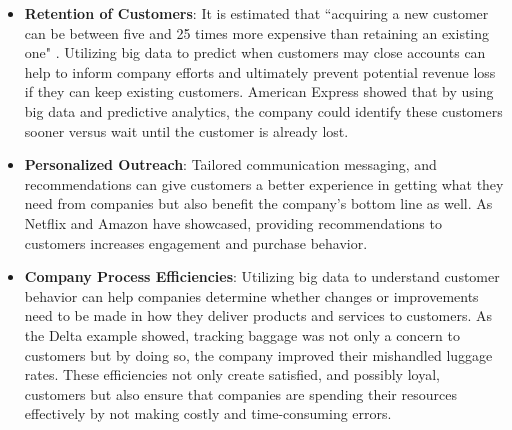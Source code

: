 \documentclass[sigconf]{acmart}
\begin{document}
\begin{itemize}
 \item \textbf{Retention of Customers}: It is estimated that ``acquiring a new customer can be between five and 25 times more expensive than retaining an existing one" \cite{Gallo2014}. Utilizing big data to predict when customers may close accounts can help to inform company efforts and ultimately prevent potential revenue loss if they can keep existing customers. American Express showed that by using big data and predictive analytics, the company could identify these customers sooner versus wait until the customer is already lost. 
 \item \textbf{Personalized Outreach}: Tailored communication messaging, and recommendations can give customers a better experience in getting what they need from companies but also benefit the company's bottom line as well. As Netflix and Amazon have showcased, providing recommendations to customers increases engagement and purchase behavior.  
 \item \textbf{Company Process Efficiencies}: Utilizing big data to understand customer behavior can help companies determine whether changes or improvements need to be made in how they deliver products and services to customers. As the Delta example showed, tracking baggage was not only a concern to customers but by doing so, the company improved their mishandled luggage rates. These efficiencies not only create satisfied, and possibly loyal, customers but also ensure that companies are spending their resources effectively by not making costly and time-consuming errors.  
\end{itemize}
\end{document}
